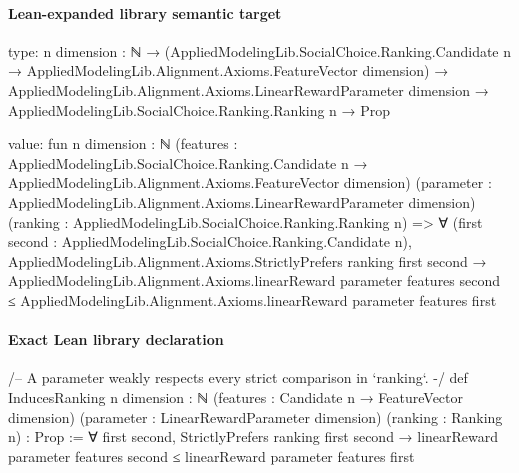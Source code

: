 \documentclass[10pt]{article}
\begin{document}
\paragraph{Lean-expanded library semantic target}
\begin{ReviewVerbatim}
type:
{n dimension : ℕ} →
  (AppliedModelingLib.SocialChoice.Ranking.Candidate n → AppliedModelingLib.Alignment.Axioms.FeatureVector dimension) →
    AppliedModelingLib.Alignment.Axioms.LinearRewardParameter dimension →
      AppliedModelingLib.SocialChoice.Ranking.Ranking n → Prop

value:
fun {n dimension : ℕ}
    (features :
      AppliedModelingLib.SocialChoice.Ranking.Candidate n → AppliedModelingLib.Alignment.Axioms.FeatureVector dimension)
    (parameter : AppliedModelingLib.Alignment.Axioms.LinearRewardParameter dimension)
    (ranking : AppliedModelingLib.SocialChoice.Ranking.Ranking n) =>
  ∀ (first second : AppliedModelingLib.SocialChoice.Ranking.Candidate n),
    AppliedModelingLib.Alignment.Axioms.StrictlyPrefers ranking first second →
      AppliedModelingLib.Alignment.Axioms.linearReward parameter features second ≤
        AppliedModelingLib.Alignment.Axioms.linearReward parameter features first
\end{ReviewVerbatim}

\paragraph{Exact Lean library declaration}
\begin{ReviewVerbatim}
/-- A parameter weakly respects every strict comparison in `ranking`. -/
def InducesRanking {n dimension : ℕ}
    (features : Candidate n → FeatureVector dimension)
    (parameter : LinearRewardParameter dimension) (ranking : Ranking n) : Prop :=
  ∀ first second,
    StrictlyPrefers ranking first second →
      linearReward parameter features second ≤ linearReward parameter features first
\end{ReviewVerbatim}
\end{document}
